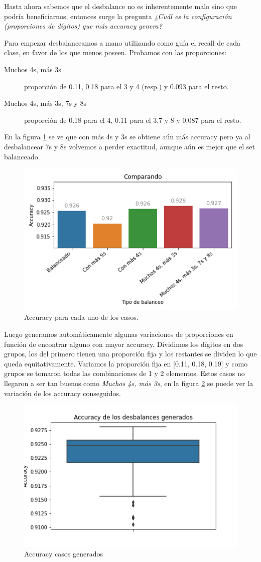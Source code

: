 \FloatBarrier
Hasta ahora sabemos que el desbalance no es inherentemente malo sino que podría beneficiarnos, entonces surge la pregunta \textit{¿Cuál es la configuración (proporciones de dígitos) que más accuracy genera?}

Para empezar desbalanceamos a mano utilizando como guía el recall de cada clase, en favor de los que menos poseen. Probamos con las proporciones: 

\begin{description}
 \item [Muchos 4s, más 3s] proporción de 0.11, 0.18 para el 3 y 4 (resp.) y 0.093 para el resto. 
 \item [Muchos 4s, más 3s, 7s y 8s] proporción de 0.18 para el 4, 0.11 para el 3,7 y 8 y 0.087 para el resto. 
\end{description}

En la figura \ref{fig:acc} se ve que con más 4s y 3s se obtiene aún más accuracy pero ya al desbalancear 7s y 8s volvemos a perder exactitud, aunque aún es mejor que el set balanceado.
\begin{figure}[h]
 \centering
 \includegraphics[width=0.65\linewidth]{images/balanceo/acc.png}
 \caption{Accuracy para cada uno de los casos.}
 \label{fig:acc}
\end{figure}
 
\FloatBarrier
Luego generamos automáticamente algunas variaciones de proporciones en función de encontrar alguno con mayor accuracy. Dividimos los dígitos en dos grupos, los del primero tienen una proporción fija y los restantes se dividen lo que queda equitativamente. Variamos la proporción fija en [0.11, 0.18, 0.19] y como grupos se tomaron todas las combinaciones de 1 y 2 elementos. Estos casos no llegaron a ser tan buenos como \textit{Muchos 4s, más 3s}, en la figura \ref{fig:accAutom} se puede ver la variación de los accuracy conseguidos.

\begin{figure}[h]
 \centering
 \includegraphics[width=0.65\linewidth]{images/balanceo/acc_generados.png}
 \caption{Accuracy casos generados}
 \label{fig:accAutom}
\end{figure}

\FloatBarrier

